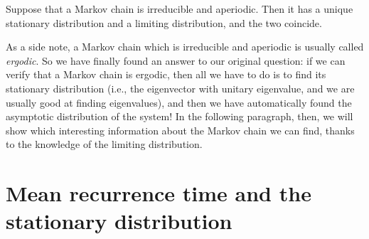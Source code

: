 \begin{theorem}
    Suppose that a Markov chain is irreducible and aperiodic. Then it has a unique stationary distribution and a limiting distribution, and the two coincide.
\end{theorem}
As a side note, a Markov chain which is irreducible and aperiodic is usually called \emph{ergodic}.
So we have finally found an answer to our original question: if we can verify that a Markov chain is ergodic, then all we have to do is to find its stationary distribution (i.e., the eigenvector with unitary eigenvalue, and we are usually good at finding eigenvalues), and then we have automatically found the asymptotic distribution of the system! In the following paragraph, then, we will show which interesting information about the Markov chain we can find, thanks to the knowledge of the limiting distribution.

\section{Mean recurrence time and the stationary distribution}
